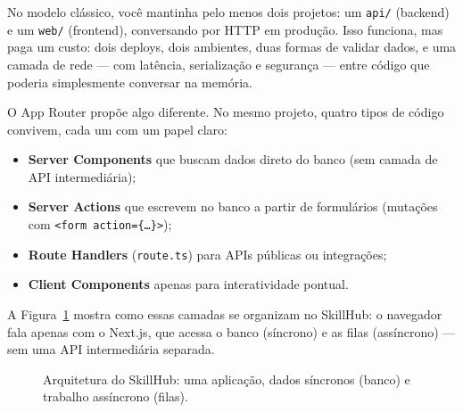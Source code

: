 No modelo clássico, você mantinha pelo menos dois projetos: um \texttt{api/}
(backend) e um \texttt{web/} (frontend), conversando por HTTP em produção.
Isso funciona, mas paga um custo: dois deploys, dois ambientes, duas formas de
validar dados, e uma camada de rede — com latência, serialização e segurança —
entre código que poderia simplesmente conversar na memória.

O App Router propõe algo diferente. No mesmo projeto, quatro tipos de código
convivem, cada um com um papel claro:

\begin{itemize}[leftmargin=*, itemsep=0.4em]
  \item \textbf{Server Components} que buscam dados direto do banco (sem camada de API intermediária);
  \item \textbf{Server Actions} que escrevem no banco a partir de formulários (mutações com \texttt{<form action=\{\ldots\}>});
  \item \textbf{Route Handlers} (\texttt{route.ts}) para APIs públicas ou integrações;
  \item \textbf{Client Components} apenas para interatividade pontual.
\end{itemize}

A Figura~\ref{fig:skillhub-arquitetura} mostra como essas camadas se
organizam no SkillHub: o navegador fala apenas com o Next.js, que acessa o
banco (síncrono) e as filas (assíncrono) — sem uma API intermediária
separada.

\begin{figure}[htbp]
  \centering
  \caption{Arquitetura do SkillHub: uma aplicação, dados síncronos (banco) e
  trabalho assíncrono (filas).}
  \label{fig:skillhub-arquitetura}
\end{figure}

